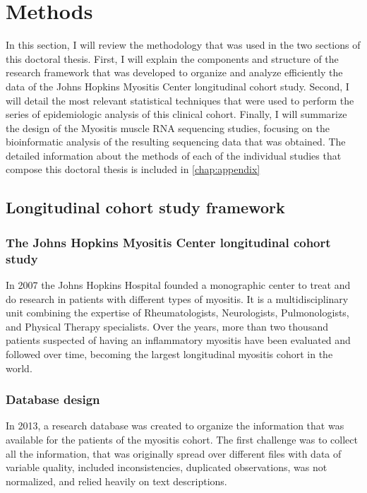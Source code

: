 \chapter{Methods}

In this section, I will review the methodology that was used in the two sections of this doctoral thesis. First, I will explain the components and structure of the research framework that was developed to organize and analyze efficiently the data of the Johns Hopkins Myositis Center longitudinal cohort study. Second, I will detail the most relevant statistical techniques that were used to perform the series of epidemiologic analysis of this clinical cohort. Finally, I will summarize the design of the Myositis muscle RNA sequencing studies, focusing on the bioinformatic analysis of the resulting sequencing data that was obtained. The detailed information about the methods of each of the individual studies that compose this doctoral thesis is included in \autoref{chap:appendix}

\section{Longitudinal cohort study framework}

\subsection{The Johns Hopkins Myositis Center longitudinal cohort study}
In 2007 the Johns Hopkins Hospital founded a monographic center to treat and do research in patients with different types of myositis. It is a multidisciplinary unit combining the expertise of Rheumatologists, Neurologists, Pulmonologists, and Physical Therapy specialists. Over the years, more than two thousand patients suspected of having an inflammatory myositis have been evaluated and followed over time, becoming the largest longitudinal myositis cohort in the world.

\subsection{Database design}

In 2013, a research database was created to organize the information that was available for the patients of the myositis cohort. The first challenge was to collect all the information, that was originally spread over different files with data of variable quality, included inconsistencies, duplicated observations, was not normalized, and relied heavily on text descriptions.

